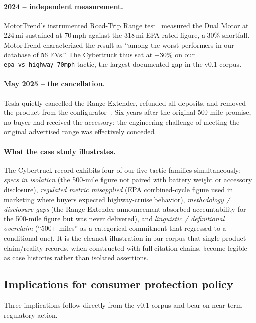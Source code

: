 \documentclass{article}
\begin{document}
\paragraph{2024 -- independent measurement.} MotorTrend's instrumented Road-Trip Range test~\cite{mt_cybertruck_2024} measured the Dual Motor at 224\,mi sustained at 70\,mph against the 318\,mi EPA-rated figure, a 30\% shortfall. MotorTrend characterized the result as ``among the worst performers in our database of 56 EVs.'' The Cybertruck thus sat at $-30\%$ on our \texttt{epa\_vs\_highway\_70mph} tactic, the largest documented gap in the v0.1 corpus.

\paragraph{May 2025 -- the cancellation.} Tesla quietly cancelled the Range Extender, refunded all deposits, and removed the product from the configurator~\cite{insideevs_cybertruck_extender}. Six years after the original 500-mile promise, no buyer had received the accessory; the engineering challenge of meeting the original advertised range was effectively conceded.

\paragraph{What the case study illustrates.} The Cybertruck record exhibits four of our five tactic families simultaneously: \emph{specs in isolation} (the 500-mile figure not paired with battery weight or accessory disclosure), \emph{regulated metric misapplied} (EPA combined-cycle figure used in marketing where buyers expected highway-cruise behavior), \emph{methodology / disclosure gaps} (the Range Extender announcement absorbed accountability for the 500-mile figure but was never delivered), and \emph{linguistic / definitional overclaim} (``500+ miles'' as a categorical commitment that regressed to a conditional one). It is the cleanest illustration in our corpus that single-product claim/reality records, when constructed with full citation chains, become legible as case histories rather than isolated assertions.

\subsection{Implications for consumer protection policy}\label{sec:policy}

Three implications follow directly from the v0.1 corpus and bear on near-term regulatory action.
\end{document}
